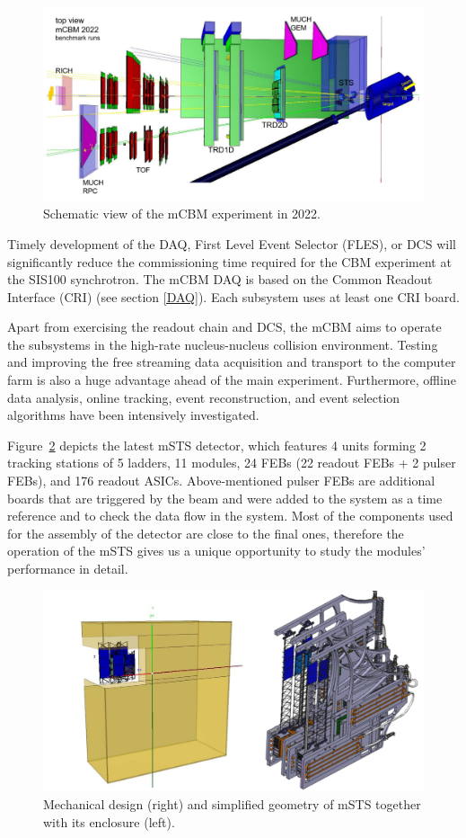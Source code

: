 \begin{figure}[!h]
\centering
\includegraphics[width=1\columnwidth]{Chapter6/DCS/images/mcbm_2021_setup.png}
\caption{Schematic view of the mCBM experiment in 2022.}
\label{fig_mcbm}
\end{figure}
\newpage
Timely development of the \gls{DAQ}, First Level Event Selector (\gls{FLES}), or \gls{DCS} will significantly reduce the commissioning time required for the \gls{CBM} experiment at the SIS100 synchrotron. The \gls{mCBM} \gls{DAQ} is based on the Common Readout Interface (\gls{CRI}) (see section \ref{DAQ}). Each subsystem uses at least one \gls{CRI} board. 

Apart from exercising the readout chain and \gls{DCS}, the \gls{mCBM} aims to operate the subsystems in the high-rate nucleus-nucleus collision environment. Testing and improving the free streaming data acquisition and transport to the computer farm is also a huge advantage ahead of the main experiment. Furthermore, offline data analysis, online tracking, event reconstruction, and event selection algorithms have been intensively investigated. 

Figure~\ref{fig_mSTS} depicts the latest \gls{mSTS} detector, which features \num{4} units forming \num{2} tracking stations of \num{5} ladders, \num{11} modules, \num{24} \glspl{FEB} (\num{22} readout \glspl{FEB} + \num{2} pulser \glspl{FEB}), and \num{176} readout \glspl{ASIC}. Above-mentioned pulser \glspl{FEB} are additional boards that are triggered by the beam and were added to the system as a time reference and to check the data flow in the system.  Most of the components used for the assembly of the detector are close to the final ones, therefore the operation of the \gls{mSTS} gives us a unique opportunity to study the modules' performance in detail.
\begin{figure}[!h]
\centering
\includegraphics[width=0.75\columnwidth]{Chapter6/DCS/images/mSTS_mech.png}
\caption{Mechanical design (right) and simplified geometry of \gls{mSTS} together with its enclosure (left).}
\label{fig_mSTS}
\end{figure}
\newpage
